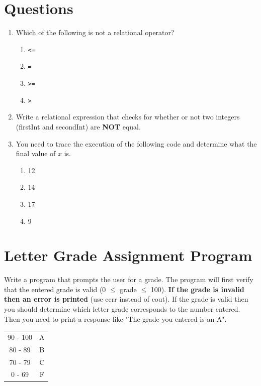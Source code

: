 \documentclass[letterpaper,12pt]{article}
\begin{document}
\section*{Questions}
\begin{enumerate}
	\item Which of the following is not a relational operator?
		\begin{enumerate}
			\item \lstinline$<=$
			\item \lstinline$=$
			\item \lstinline$>=$
			\item \lstinline$>$
		\end{enumerate}
	\item \nohyphens{Write a relational expression that checks for whether or not two integers (firstInt and secondInt) are \textbf{NOT} equal.}
		\vspace{20mm}
	\item You need to trace the execution of the following code and determine what the final value of $x$ is.
		
		\begin{enumerate}
			\item 12
			\item 14
			\item 17
			\item 9
		\end{enumerate}

\end{enumerate}

\section*{Letter Grade Assignment Program}
Write a program that prompts the user for a grade.  The program will first
verify that the entered grade is valid (0 $\le$ grade $\le$ 100). \textbf{If the grade is invalid
then an error is printed} (use cerr instead of cout).  If the grade is valid then you should determine 
which letter grade corresponds to the number entered. Then you need to print a response like "The grade you entered is an A".

\vspace{5mm}

\begin{table}[h]
	\centering
	\begin{tabular}{|c|c|}
		90 - 100 & A \\
		80 - 89  & B \\
		70 - 79  & C \\
		0  - 69  & F \\
	\end{tabular}
\end{table}
\end{document}
